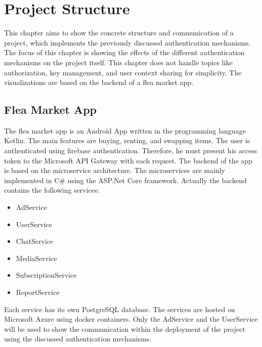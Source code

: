 \chapter{Project Structure}
\label{cha:project_structure}
This chapter aims to show the concrete structure and communication of a project, which implements the previously discussed authentication mechanisms.
The focus of this chapter is showing the effects of the different authentication mechanisms on the project itself.
This chapter does not handle topics like authorization, key management, and user context sharing for simplicity.
The visualizations are based on the backend of a flea market app.

\section{Flea Market App}
The flea market app is an Android App written in the programming language Kotlin.
The main features are buying, renting, and swapping items.
The user is authenticated using firebase authentication.
Therefore, he must present his access token to the Microsoft API Gateway with each request.
The backend of the app is based on the microservice architecture.
The microservices are mainly implemented in C\# using the ASP.Net Core framework.
Actually the backend contains the following services:
\begin{itemize}
	\item AdService
	\item UserService
	\item ChatService
	\item MediaService
	\item SubscriptionService
	\item ReportService
\end{itemize}
Each service has its own PostgreSQL database.
The services are hosted on Microsoft Azure using docker containers.
Only the AdService and the UserService will be used to show the communication within the deployment of the project using the discussed authentication mechanisms.

